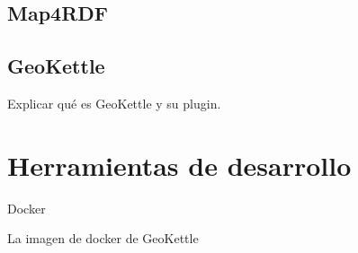 \subsection{Map4RDF}


\subsection{GeoKettle} Explicar qué es GeoKettle y su plugin.

\section{Herramientas de desarrollo} Docker

La imagen de docker de GeoKettle


